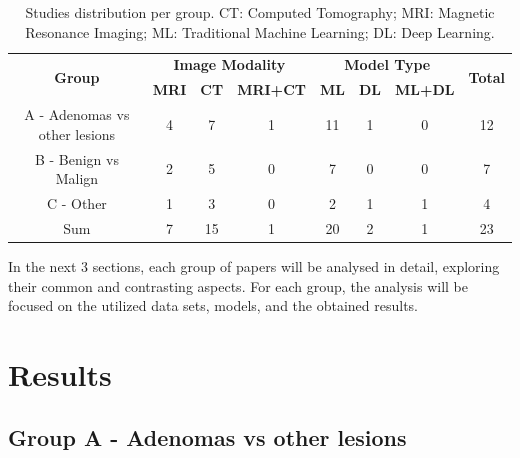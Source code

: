 \documentclass[11pt]{article}
\begin{document}
\begin{table}[h]
    \centering
    \begin{tabular}{cccccccc}\toprule
        \multirow{2}{*}{\textbf{Group}} & \multicolumn{3}{c}{\textbf{Image Modality}} & \multicolumn{3}{c}{\textbf{Model Type}} & \multirow{2}{*}{\textbf{Total}}
        \\\cmidrule(lr){2-4} \cmidrule(lr){5-7}
                                        & \textbf{MRI}                                & \textbf{CT}                             & \textbf{MRI+CT}                 & \textbf{ML} & \textbf{DL} & \textbf{ML+DL}      \\\midrule
        A - Adenomas vs other lesions   & 4                                           & 7                                       & 1                               & 11          & 1           & 0              & 12 \\
        B - Benign vs Malign            & 2                                           & 5                                       & 0                               & 7           & 0           & 0              & 7  \\
        C - Other                       & 1                                           & 3                                       & 0                               & 2           & 1           & 1              & 4  \\
        Sum                             & 7                                           & 15                                      & 1                               & 20          & 2           & 1              & 23 \\
        \bottomrule
    \end{tabular}
    \caption{Studies distribution per group. CT: Computed Tomography; MRI: Magnetic Resonance Imaging; ML: Traditional Machine Learning; DL: Deep Learning.}
    \label{tab:sota_sum}
\end{table}

In the next 3 sections, each group of papers will be analysed in detail,
exploring their common and contrasting aspects. For each group, the analysis
will be focused on the utilized data sets, models, and the obtained results.

\section{Results}

\subsection{Group A - Adenomas vs other lesions}
\end{document}
